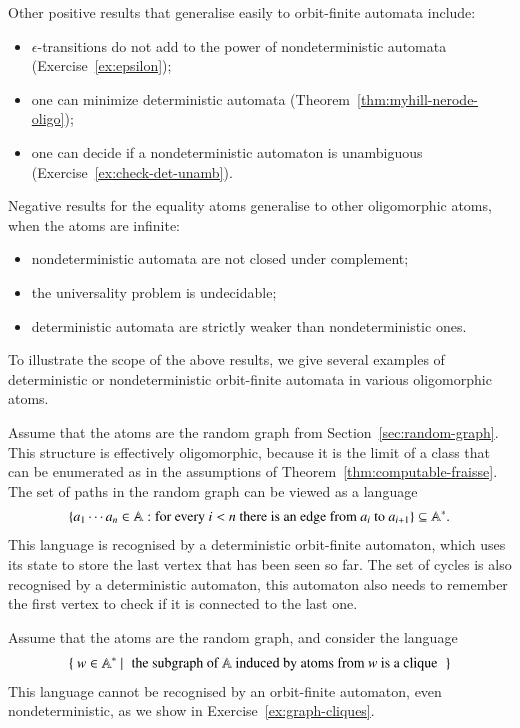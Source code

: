 Other positive results that generalise easily to orbit-finite automata include:
\begin{itemize}
	\item  $\epsilon$-transitions do not add to the power of nondeterministic automata (Exercise~\ref{ex:epsilon});
	\item one can minimize deterministic automata (Theorem~\ref{thm:myhill-nerode-oligo});
	\item one can decide if a nondeterministic automaton is unambiguous (Exercise~\ref{ex:check-det-unamb}).
\end{itemize}
Negative results for the equality atoms generalise to other oligomorphic atoms, when the atoms are infinite: 
\begin{itemize}
	\item nondeterministic  automata are not closed under complement;
	\item the universality problem is undecidable;
	\item deterministic automata are strictly weaker than nondeterministic ones.
\end{itemize}



To illustrate the scope of the above results,  we  give several examples of deterministic or nondeterministic orbit-finite automata in various oligomorphic atoms. 
\begin{myexample}\label{ex:graph-atoms-automaton} Assume that the atoms are the random graph from Section~\ref{sec:random-graph}. This structure is effectively oligomorphic, because it is the \fraisse limit of a \fraisse class that can be enumerated as in the assumptions of Theorem~\ref{thm:computable-fraisse}. The set of paths in the random graph can be viewed as a language 
	\begin{align*}
	\{ a_1 \cdots a_n \in \mathbb A : \text{for every $i <n $ there is an edge from $a_i$ to $a_{i+1}$}\} \subseteq \mathbb A^*.
	\end{align*}
	This language is recognised by a deterministic orbit-finite automaton, which uses its state to store the last vertex that has been seen so far. The set of cycles is also recognised by a deterministic automaton, this automaton also needs to remember the first vertex to check if it is connected to the last one. 
   \end{myexample}

   \begin{myexample}
	\label{ex:graph-atoms-connected} Assume that the atoms are the random graph, and consider the language 
	\begin{align*}
	\setbuild{ w \in \atoms^*}{the subgraph of $\atoms$ induced by atoms from $w$ is a clique}
	\end{align*}
	This language cannot be recognised by an orbit-finite automaton, even nondeterministic, as we show in Exercise~\ref{ex:graph-cliques}.
   \end{myexample}
   
